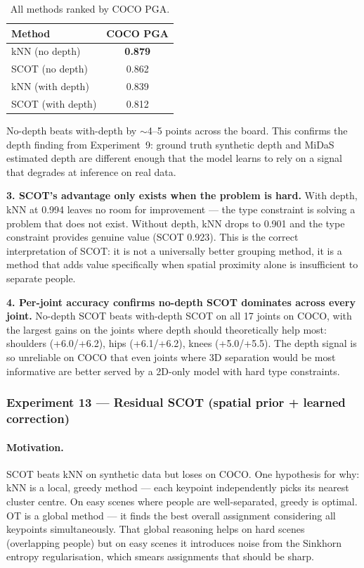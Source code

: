 \begin{table}[H]
\centering
\footnotesize
\begin{tabular}{lc}
\toprule
Method & COCO PGA \\
\midrule
kNN (no depth) & \textbf{0.879} \\
SCOT (no depth) & 0.862 \\
kNN (with depth) & 0.839 \\
SCOT (with depth) & 0.812 \\
\bottomrule
\end{tabular}
\caption{All methods ranked by COCO PGA.}
\end{table}

No-depth beats with-depth by $\sim$4--5 points across the board. This confirms the depth finding from Experiment~9: ground truth synthetic depth and MiDaS estimated depth are different enough that the model learns to rely on a signal that degrades at inference on real data.

\textbf{3. SCOT's advantage only exists when the problem is hard.} With depth, kNN at 0.994 leaves no room for improvement --- the type constraint is solving a problem that does not exist. Without depth, kNN drops to 0.901 and the type constraint provides genuine value (SCOT 0.923). This is the correct interpretation of SCOT: it is not a universally better grouping method, it is a method that adds value specifically when spatial proximity alone is insufficient to separate people.

\textbf{4. Per-joint accuracy confirms no-depth SCOT dominates across every joint.} No-depth SCOT beats with-depth SCOT on all 17 joints on COCO, with the largest gains on the joints where depth should theoretically help most: shoulders (+6.0/+6.2), hips (+6.1/+6.2), knees (+5.0/+5.5). The depth signal is so unreliable on COCO that even joints where 3D separation would be most informative are better served by a 2D-only model with hard type constraints.


\subsubsection{Experiment 13 --- Residual SCOT (spatial prior + learned correction)}

\paragraph{Motivation.}

SCOT beats kNN on synthetic data but loses on COCO. One hypothesis for why: kNN is a local, greedy method --- each keypoint independently picks its nearest cluster centre. On easy scenes where people are well-separated, greedy is optimal. OT is a global method --- it finds the best overall assignment considering all keypoints simultaneously. That global reasoning helps on hard scenes (overlapping people) but on easy scenes it introduces noise from the Sinkhorn entropy regularisation, which smears assignments that should be sharp.


